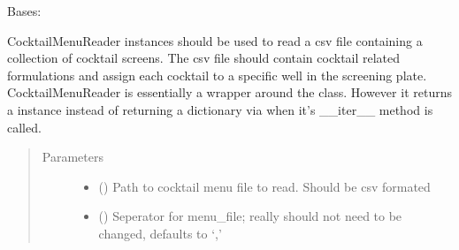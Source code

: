 \documentclass[letterpaper,10pt,english]{sphinxmanual}
\begin{document}
\begin{fulllineitems}
\label{\detokenize{polo.utils:polo.utils.io_utils.CocktailMenuReader}}
Bases: 

CocktailMenuReader instances should be used to read a csv file containing
a collection of cocktail screens. The csv file should contain cocktail
related formulations and assign each cocktail to a specific well in the
screening plate. CocktailMenuReader is essentially a wrapper around 
the  class. However it returns a  instance 
instead of returning a dictionary via when it’s \_\_iter\_\_ method is called.

\begin{sphinxVerbatim}[commandchars=\\\{\}]
  
  
  
\end{sphinxVerbatim}
\begin{quote}\begin{description}
\item[{Parameters}] \leavevmode\begin{itemize}
\item {} 
 () \textendash{} Path to cocktail menu file to read. Should be csv
formated

\item {} 
 (\sphinxstyleliteralemphasis{\sphinxupquote{, }}) \textendash{} Seperator for menu\_file; really should not need to 
be changed, defaults to ‘,’


\end{itemize}
\end{description}
\end{quote}
\end{fulllineitems}
\end{document}
